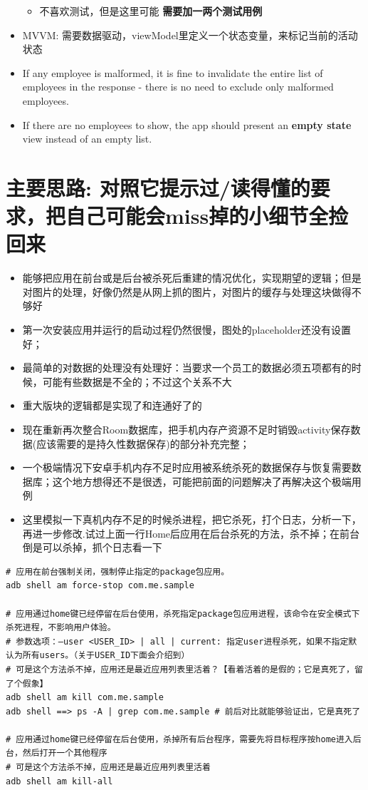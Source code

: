 \documentclass[9pt, b5paper]{article}
\begin{document}
\begin{itemize}
\begin{itemize}
\item 不喜欢测试，但是这里可能 \textbf{需要加一两个测试用例}
\end{itemize}
\item MVVM: 需要数据驱动，viewModel里定义一个状态变量，来标记当前的活动状态
\item If any employee is malformed, it is fine to invalidate the entire list of employees in the response - there is no need to exclude only malformed employees.
\item If there are no employees to show, the app should present an \textbf{empty state} view instead of an empty list.
\end{itemize}

\section{主要思路: \textbf{对照它提示过/读得懂的要求，把自己可能会miss掉的小细节全捡回来}}
\label{sec-2}
\begin{itemize}
\item 能够把应用在前台或是后台被杀死后重建的情况优化，实现期望的逻辑；但是对图片的处理，好像仍然是从网上抓的图片，对图片的缓存与处理这块做得不够好
\item 第一次安装应用并运行的启动过程仍然很慢，图处的placeholder还没有设置好；
\item 最简单的对数据的处理没有处理好：当要求一个员工的数据必须五项都有的时候，可能有些数据是不全的；不过这个关系不大
\item 重大版块的逻辑都是实现了和连通好了的
\item 现在重新再次整合Room数据库，把手机内存产资源不足时销毁activity保存数据(应该需要的是持久性数据保存)的部分补充完整；
\item 一个极端情况下安卓手机内存不足时应用被系统杀死的数据保存与恢复需要数据库；这个地方想得还不是很透，可能把前面的问题解决了再解决这个极端用例
\item 这里模拟一下真机内存不足的时候杀进程，把它杀死，打个日志，分析一下，再进一步修改.试过上面一行Home后应用在后台杀死的方法，杀不掉；在前台倒是可以杀掉，抓个日志看一下
\end{itemize}
\begin{verbatim}
# 应用在前台强制关闭，强制停止指定的package包应用。
adb shell am force-stop com.me.sample 

# 应用通过home键已经停留在后台使用，杀死指定package包应用进程，该命令在安全模式下杀死进程，不影响用户体验。
# 参数选项：–user <USER_ID> | all | current: 指定user进程杀死，如果不指定默认为所有users。（关于USER_ID下面会介绍到）
# 可是这个方法杀不掉，应用还是最近应用列表里活着？【看着活着的是假的；它是真死了，留了个假象】
adb shell am kill com.me.sample 
adb shell ==> ps -A | grep com.me.sample # 前后对比就能够验证出，它是真死了

# 应用通过home键已经停留在后台使用，杀掉所有后台程序，需要先将目标程序按home进入后台，然后打开一个其他程序
# 可是这个方法杀不掉，应用还是最近应用列表里活着
adb shell am kill-all 　　　　　　　　　　　　　
\end{verbatim}
\end{document}
